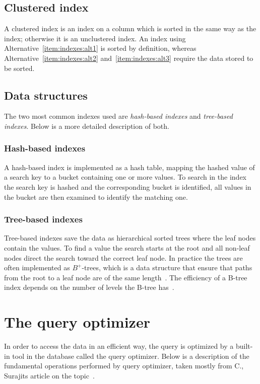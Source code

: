 \subsection{Clustered index}
A clustered index is an index on a column which is sorted in the same way as the
index; otherwise it is an unclustered index. An index using
Alternative~\ref{item:indexes:alt1} is sorted by definition, whereas
Alternative~\ref{item:indexes:alt2} and~\ref{item:indexes:alt3} require the data
stored to be sorted.

\subsection{Data structures}
The two most common indexes used are \textit{hash-based indexes} and
\textit{tree-based indexes}. Below is a more detailed description of both.

\subsubsection{Hash-based indexes}
A hash-based index is implemented as a hash table, mapping the hashed value of a
search key to a bucket containing one or more values. To search in the index the
search key is hashed and the corresponding bucket is identified, all values in
the bucket are then examined to identify the matching one.

\subsubsection{Tree-based indexes}
Tree-based indexes save the data as hierarchical sorted trees where the leaf
nodes contain the values. To find a value the search starts at the root and all
non-leaf nodes direct the search toward the correct leaf node. In practice the
trees are often implemented as $B^{+}$-trees, which is a data structure that
ensure that paths from the root to a leaf node are of the same
length~\cite{comer_1979_ubiquitous_ub}. The efficiency of a B-tree index depends
on the number of levels the B-tree
has~\cite[p.~645]{garcia-molina_2002_database_dstcb}.

\section{The query optimizer}\label{sec:queryopt}
In order to access the data in an efficient way, the query is optimized by a
built-in tool in the database called the query optimizer. Below is a
description of the fundamental operations performed by query optimizer, taken
mostly from C., Surajits article on the
topic~\cite{chaudhuri_1998_overview_aooqoirs}.

